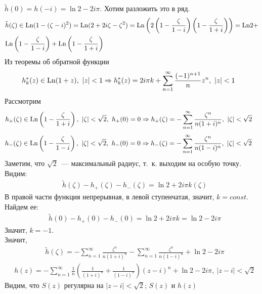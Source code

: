 $\tilde{h}(0) = h(-i) = \ln 2 - 2 i \pi$. Хотим разложить это в ряд.
\begin{align*}
  & \tilde{h}(\zeta) \in \mathrm{Ln} (1-(\zeta - i)^2) = \mathrm{Ln}(2+2i\zeta - \zeta^2) = \mathrm{Ln} \left(2\left( 1 - \frac{\zeta}{1-i} \right)\left( 1 - \frac{\zeta}{1+i} \right) \right) = \mathrm{Ln} 2 + \\
  & \mathrm{Ln} \left( 1 - \frac{\zeta}{1-i} \right) + \mathrm{Ln} \left( 1 - \frac{\zeta}{1+i} \right)
\end{align*}
Из теоремы об обратной функции
\begin{align*}
  & h^*_k(z) \in \Ln (1+z), \ \left| z \right| < 1 \Rightarrow h^*_k(z) = 2 i \pi k + \sum_{n=1}^\infty \frac{(-1)^{n+1}}{n} z^n, \ \left| z \right| < 1
\end{align*}
Рассмотрим
\begin{align*}
  & h_+(\zeta) \in \Ln \left( 1 - \frac{\zeta}{1+i} \right), \ \left| \zeta \right| < \sqrt{2}, \ h_+(0) = 0 \Rightarrow h_+(\zeta) = - \sum_{n=1}^\infty \frac{\zeta^n}{n(1+i)^n}, \ \left| \zeta \right| < \sqrt{2}
\end{align*}
\begin{align*}
  & h_-(\zeta) \in \Ln \left( 1 - \frac{\zeta}{1-i} \right), \ \left| \zeta \right| < \sqrt{2}, \ h_-(0) = 0 \Rightarrow h_-(\zeta) = - \sum_{n=1}^\infty \frac{\zeta^n}{n(1-i)^n}, \ \left| \zeta \right| < \sqrt{2}
\end{align*}
Заметим, что $\sqrt{2}$~--- максимальный радиус, т.~к. выходим на особую точку.
Видим:
\begin{align*}
  & \tilde{h}(\zeta) - h_+(\zeta) - h_-(\zeta) = \ln 2 + 2 i \pi k(\zeta)
\end{align*}
В правой части функция непрерывная, в левой ступенчатая, значит, $k = const$.
Найдем ее:
\begin{align*}
  &  \tilde{h}(0) - h_+(0) - h_-(0) = \ln 2 + 2 i \pi k = \ln 2 - 2 i \pi
\end{align*}
Значит, $k = -1$.
\\
Значит,
\begin{align*}
  & \tilde{h}(\zeta) = - \sum_{n=1}^\infty \frac{\zeta^n}{n(1+i)^n} - \sum_{n=1}^\infty \frac{\zeta^n}{n(1-i)^n} + \ln 2 - 2 i \pi
\end{align*}
\begin{align*}
  & h(z) = - \sum_{n=1}^\infty \frac{1}{n}\left( \frac{1}{(1+i)^n}+ \frac{1}{(1-i)^n}\right)(z-i)^n + \ln 2 - 2 i \pi, \ \left| z-i \right|< \sqrt{2}
\end{align*}
Видим, что $S(z)$ регулярна на $\left| z-i \right|< \sqrt{2}$; $S(z)$ и $h(z)$
